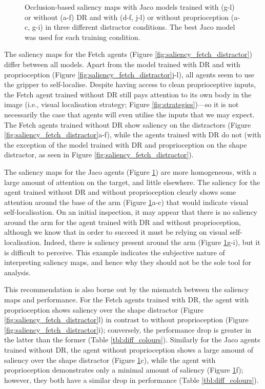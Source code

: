 \begin{figure}
\begin{subfigure}{0.24\columnwidth}
  \end{subfigure}
  \caption{Occlusion-based saliency maps with Jaco models trained with (g-l) or without (a-f) DR and with (d-f, j-l) or without proprioception (a-c, g-i) in three different distractor conditions. The best Jaco model was used for each training condition.}
  \label{fig:saliency_jaco_distractor}
\end{figure}

The saliency maps for the Fetch agents (Figure
\ref{fig:saliency_fetch_distractor}) differ between all models. Apart
from the model trained with DR and with proprioception (Figure
\ref{fig:saliency_fetch_distractor}j-l), all agents seem to use the
gripper to self-localise. Despite having access to clean proprioceptive
inputs, the Fetch agent trained without DR still pays attention to its
own body in the image (i.e., visual localisation strategy; Figure
\ref{fig:strategies})---so it is not necessarily the case that agents
will even utilise the inputs that we may expect. The Fetch agents
trained without DR show saliency on the distractors (Figure
\ref{fig:saliency_fetch_distractor}a-f), while the agents trained with
DR do not (with the exception of the model trained with DR and
proprioception on the shape distractor, as seen in Figure
\ref{fig:saliency_fetch_distractor}).

The saliency maps for the Jaco agents (Figure
\ref{fig:saliency_jaco_distractor}) are more homogeneous, with a large
amount of attention on the target, and little elsewhere. The saliency
for the agent trained without DR and without proprioception clearly
shows some attention around the base of the arm (Figure
\ref{fig:saliency_jaco_distractor}a-c) that would indicate visual
self-localisation. On an initial inspection, it may appear that there is
no saliency around the arm for the agent trained with DR and without
proprioception, although we know that in order to succeed it must be
relying on visual self-localisation. Indeed, there is saliency present
around the arm (Figure \ref{fig:saliency_jaco_distractor}g-i), but it is
difficult to perceive. This example indicates the subjective nature of
interpreting saliency maps, and hence why they should not be the sole
tool for analysis.

This recommendation is also borne out by the mismatch between the
saliency maps and performance. For the Fetch agents trained with DR, the
agent with proprioception shows saliency over the shape distractor
(Figure \ref{fig:saliency_fetch_distractor}l) in contrast to without
proprioception (Figure \ref{fig:saliency_fetch_distractor}i);
conversely, the performance drop is greater in the latter than the
former (Table \ref{tbl:diff_colours}). Similarly for the Jaco agents
trained without DR, the agent without proprioception shows a large
amount of saliency over the shape distractor (Figure
\ref{fig:saliency_jaco_distractor}c), while the agent with
proprioception demonstrates only a minimal amount of saliency (Figure
\ref{fig:saliency_jaco_distractor}f); however, they both have a similar
drop in performance (Table \ref{tbl:diff_colours}).

